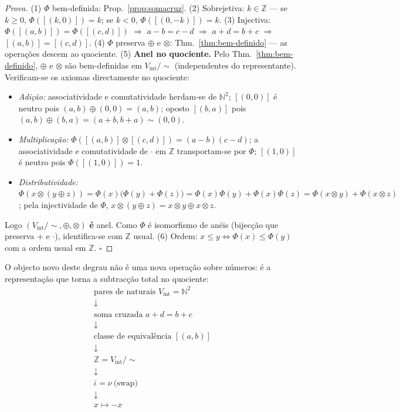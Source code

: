 \documentclass[11pt,a4paper]{article}
\begin{document}
\begin{proof}[Prova]
(1) $\Phi$ bem-definida: Prop.~\ref{prop:somacruz}.
(2) Sobrejetiva: $k\in\mathbb{Z}$ --- se $k\ge0$, $\Phi([(k,0)])=k$; se
$k<0$, $\Phi([(0,-k)])=k$.
(3) Injectiva: $\Phi([(a,b)])=\Phi([(c,d)])$ $\Rightarrow$ $a-b=c-d$
$\Rightarrow$ $a+d=b+c$ $\Rightarrow$ $[(a,b)]=[(c,d)]$.
(4) $\Phi$ preserva $\oplus$ e $\otimes$: Thm.~\ref{thm:bem-definido} --- as
operações descem ao quociente.
(5) \textbf{Anel no quociente.} Pelo Thm.~\ref{thm:bem-definido}, $\oplus$ e
$\otimes$ são bem-definidas em $V_{\mathrm{int}}/{\sim}$ (independentes do
representante). Verificam-se os axiomas directamente no quociente:
\begin{itemize}\itemsep1pt
\item \emph{Adição:} associatividade e comutatividade herdam-se de
      $\mathbb{N}^{2}$; $[(0,0)]$ é neutro pois
      $(a,b)\oplus(0,0)=(a,b)$; oposto $[(b,a)]$ pois
      $(a,b)\oplus(b,a)=(a+b,b+a)\sim(0,0)$.
\item \emph{Multiplicação:} $\Phi([(a,b)]\otimes[(c,d)])=(a-b)(c-d)$; a
      associatividade e comutatividade de $\cdot$ em $\mathbb{Z}$ transportam-se
      por $\Phi$; $[(1,0)]$ é neutro pois $\Phi([(1,0)])=1$.
\item \emph{Distributividade:}
      $\Phi(x\otimes(y\oplus z))=\Phi(x)\bigl(\Phi(y)+\Phi(z)\bigr)
      =\Phi(x)\Phi(y)+\Phi(x)\Phi(z)
      =\Phi(x\otimes y)+\Phi(x\otimes z)$; pela injectividade de $\Phi$,
      $x\otimes(y\oplus z)=x\otimes y\oplus x\otimes z$.
\end{itemize}
Logo $(V_{\mathrm{int}}/{\sim},\oplus,\otimes)$ \textbf{é} anel. Como
$\Phi$ é isomorfismo de anéis (bijecção que preserva $+$ e $\cdot$), identifica-se
com $\mathbb{Z}$ usual.
(6) Ordem: $x\le y\iff\Phi(x)\le\Phi(y)$ com a ordem usual em $\mathbb{Z}$.
$\square$
\end{proof}

\noindent O objecto novo deste degrau não é uma nova operação sobre números: é
a representação que torna a subtracção total no quociente:
\[
\boxed{
\begin{array}{c}
\text{pares de naturais }V_{\mathrm{int}}=\mathbb{N}^{2}\\
\downarrow\\
\text{soma cruzada }a+d=b+c\\
\downarrow\\
\text{classe de equivalência }[(a,b)]\\
\downarrow\\
\mathbb{Z}=V_{\mathrm{int}}/{\sim}\\
\downarrow\\
\bar\iota=\nu\ \text{(swap)}\\
\downarrow\\
x\mapsto -x
\end{array}}
\]
\end{document}
